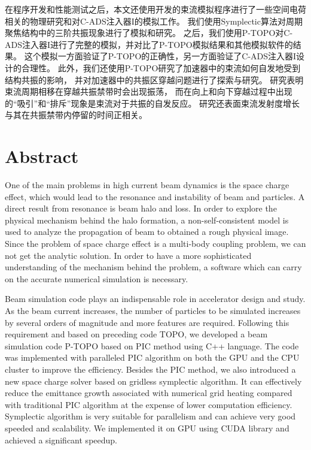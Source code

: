 在程序开发和性能测试之后，本文还使用开发的束流模拟程序进行了一些空间电荷相关的物理研究和对C-ADS注入器I的模拟工作。
我们使用Symplectic算法对周期聚焦结构中的三阶共振现象进行了模拟和研究。
之后，我们使用P-TOPO对C-ADS注入器I进行了完整的模拟，并对比了P-TOPO模拟结果和其他模拟软件的结果。
这个模拟一方面验证了P-TOPO的正确性，另一方面验证了C-ADS注入器I设计的合理性。
此外，我们还使用P-TOPO研究了加速器中的束流如何自发地受到结构共振的影响，
并对加速器中的共振区穿越问题进行了探索与研究。
研究表明束流周期相移在穿越共振禁带时会出现振荡，
而在向上和向下穿越过程中出现的“吸引”和“排斥”现象是束流对于共振的自发反应。
研究还表面束流发射度增长与其在共振禁带内停留的时间正相关。



\chapter{Abstract}%

One of the main problems in high current beam dynamics is the space charge effect, which would lead to the resonance and instability of beam and particles.
A direct result from resonance is beam halo and loss.
In order to explore the physical mechanism behind the halo formation,
a non-self-consistent model is used to analyze the propagation of beam to obtained a rough physical image.
Since the problem of space charge effect is a multi-body coupling problem, we can not get the analytic solution.
In order to have a more sophisticated understanding of the mechanism behind the problem,
a software which can carry on the accurate numerical simulation is necessary.

Beam simulation code plays an indispensable role in accelerator design and study.
As the beam current increases, the number of particles to be simulated increases
by several orders of magnitude and more features are required.
Following this requirement and based on preceding code TOPO, we developed a beam
simulation code P-TOPO based on PIC method using C++ language.
The code was implemented with paralleled PIC algorithm on
both the GPU and the CPU cluster to improve the efficiency.
Besides the PIC method, we also introduced a new space
charge solver based on gridless symplectic algorithm.
It can effectively reduce the emittance growth associated with numerical
grid heating compared with traditional PIC algorithm at the expense of lower computation efficiency.
Symplectic algorithm is very suitable for parallelism and can achieve very good speeded and scalability.
We implemented it on GPU using CUDA library and achieved a significant speedup.

